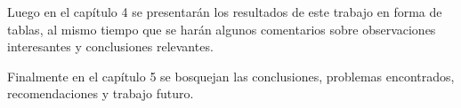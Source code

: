 Luego en el capítulo 4 se presentarán los resultados de este trabajo en forma de tablas, al mismo tiempo que se harán algunos comentarios sobre observaciones interesantes y conclusiones relevantes.

Finalmente en el capítulo 5 se bosquejan las conclusiones, problemas encontrados, recomendaciones y trabajo futuro.


